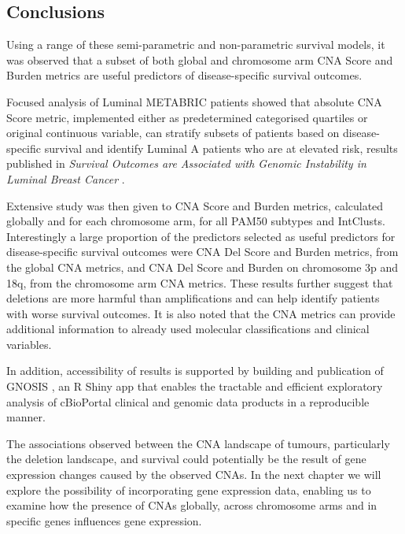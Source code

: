 \newpage

\subsection{Conclusions}
Using a range of these semi-parametric and non-parametric survival models, it was observed that a subset of both global and chromosome arm CNA Score and Burden metrics are useful predictors of disease-specific survival outcomes. 

Focused analysis of Luminal METABRIC patients showed that absolute CNA Score metric, implemented either as predetermined categorised quartiles or original continuous variable, can stratify subsets of patients based on disease-specific survival and identify Luminal A patients who are at elevated risk, results published in \textit{Survival Outcomes are Associated with Genomic Instability in Luminal Breast Cancer} \citep{King_2021}. 

Extensive study was then given to CNA Score and Burden metrics, calculated globally and for each chromosome arm, for all PAM50 subtypes and IntClusts. Interestingly a large proportion of the predictors selected as useful predictors for disease-specific survival outcomes were CNA Del Score and Burden metrics, from the global CNA metrics, and CNA Del Score and Burden on chromosome 3p and 18q, from the chromosome arm CNA metrics. These results further suggest that deletions are more harmful than amplifications and can help identify patients with worse survival outcomes. It is also noted that the CNA metrics can provide additional information to already used molecular classifications and clinical variables. 

In addition, accessibility of results is supported by building and publication of GNOSIS \citep{King_GNOSIS}, an R Shiny app that enables the tractable and efficient exploratory analysis of cBioPortal clinical and genomic data products in a reproducible manner.

The associations observed between the CNA landscape of tumours, particularly the deletion landscape, and survival could potentially be the result of gene expression changes caused by the observed CNAs. In the next chapter we will explore the possibility of incorporating gene expression data, enabling us to examine how the presence of CNAs globally, across chromosome arms and in specific genes influences gene expression.  

